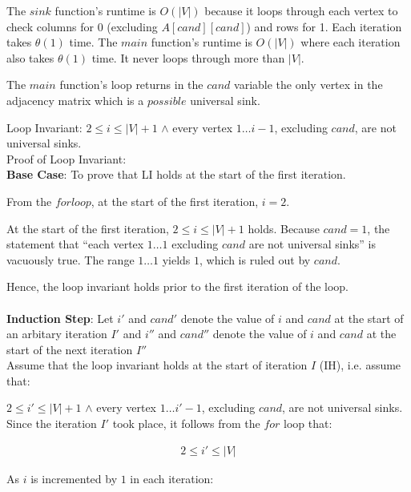 \documentclass[a4paper]{report}
\begin{document}
\begin{enumerate}
      The $sink$ function's runtime is $O(|V|)$ because it loops through each vertex to check columns for 0 (excluding $A[cand][cand]$)
      and rows for 1. Each iteration takes $\theta(1)$ time. 
      The $main$ function's runtime is $O(|V|)$ where each iteration also takes $\theta(1)$ time. It never loops through more than $|V|$.

      The $main$ function's loop returns in the $cand$ variable the only vertex in the adjacency matrix which is a $possible$ universal sink. 

      Loop Invariant: $2 \leq i \leq |V| + 1$ $\wedge$ every vertex $1\dots i-1$, excluding $cand$, are not universal sinks.\\

      Proof of Loop Invariant:\\
      {\bf Base Case}: To prove that LI holds at the start of the first iteration.

      From the $for loop$, at the start of the first iteration, $i = 2$.

      At the start of the first iteration, $ 2 \leq i \leq |V| + 1 $ holds. Because $cand = 1$, the statement that ``each vertex $1 \dots 1$
      excluding $cand$ are not universal sinks'' is vacuously true. The range $1 \dots 1$ yields $1$, which is ruled out by $cand$.

      Hence, the loop invariant holds prior to the first iteration of the loop.\\\\

      {\bf Induction Step}: Let $i'$ and $cand'$ denote the value of $i$ and $cand$ at the start of an arbitary iteration $I'$ and 
      $i''$ and $cand''$ denote the value of $i$ and $cand$ at the start of the next iteration $I''$ \\
      
      Assume that the loop invariant holds at the start of iteration $I$ (IH), i.e. assume that:

      $2 \leq i' \leq |V| + 1$ $\wedge$ every vertex $1\dots i'-1$, excluding $cand$, are not universal sinks.\\

      Since the iteration $I'$ took place, it follows from the $for$ loop that:

      \begin{align}
        2 \leq i' \leq |V|
      \end{align}

      As $i$ is incremented by $1$ in each iteration:


\end{enumerate}
\end{document}
